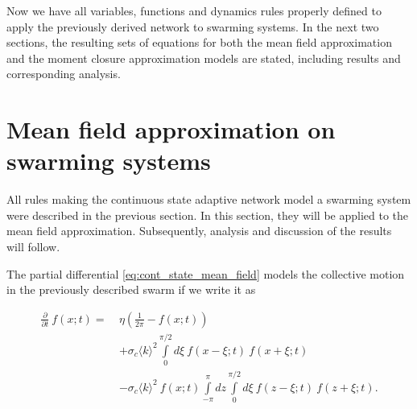 Now we have all variables, functions and dynamics rules properly defined to apply the previously derived network to swarming systems. In the next two sections, the resulting sets of equations for both the mean field approximation and the moment closure approximation models are stated, including results and corresponding analysis.

\section{Mean field approximation on swarming systems}
All rules making the continuous state adaptive network model a swarming system were described in the previous section. In this section, they will be applied to the mean field approximation. Subsequently, analysis and discussion of the results will follow. 

The partial differential \cref{eq:cont_state_mean_field} models the collective motion in the previously described swarm if we write it as 

\begin{equation}
\begin{aligned}
\frac{\partial}{\partial t}\ f(x;t) =\ & 
\eta \left( \frac{1}{2\pi} - f(x;t) \right) \\
&	+ \sigma_c\langle k \rangle^2  \int\limits_{0}^{\pi/2} d\xi\
f(x-\xi;t)\ f(x+\xi;t) \\
&	- \sigma_c \langle k \rangle^2\ f(x;t) \int\limits_{-\pi}^\pi dz \int\limits_{0}^{\pi/2} d\xi\ f(z-\xi;t)\ f(z+\xi;t).
\label{eq:cont_state_mean_field_swarming}
\end{aligned}
\end{equation}


